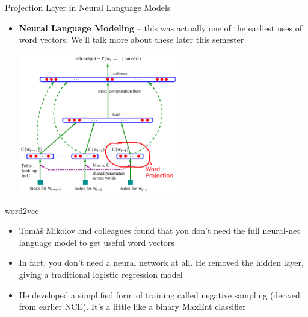 \documentclass[xcolor=pdftex,x11names,table,hyperref]{beamer}
\begin{document}
\begin{frame}{Projection Layer in Neural Language Models}
\begin{itemize}
	\item \textbf{Neural Language Modeling} -- this was actually one of the earliest uses of word vectors.  We'll talk more about these later this semester \\
		\begin{center}
		\includegraphics[width=0.55\textwidth]{images/bengio-etal2003_pg6_image_alt.pdf} 
		\end{center}
\end{itemize}
\end{frame}


\begin{frame}{word2vec}
\begin{itemize}
	\item Tom\'{a}\v{s} Mikolov and colleagues found that you don't need the full neural-net language model to get useful word vectors
	\pause
	\item In fact, you don't need a neural network at all. He removed the hidden layer, giving a traditional logistic regression model
	\pause
	\item He developed a simplified form of training called negative sampling (derived from earlier NCE).  It's a little like a binary MaxEnt  classifier
\end{itemize}
\end{frame}
\end{document}
